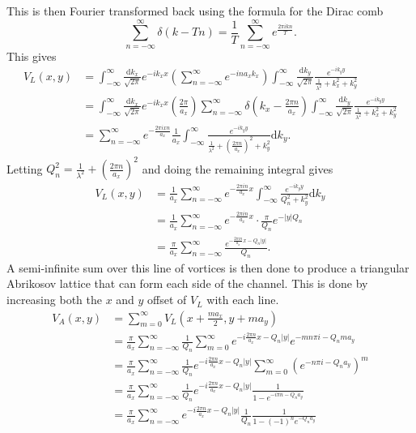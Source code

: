 \documentclass{article}
\numberwithin{equation}{section}
\begin{document}
This is then Fourier transformed back using the formula for the Dirac comb
\begin{equation}
    \sum_{n=-\infty}^\infty\delta(k-Tn) = \frac{1}{T}\sum_{n=-\infty}^\infty e^{\frac{2\pi ikn}{T}}.
\end{equation}
This gives
\begin{align*}
    V_L(x, y) &= \int_{-\infty}^\infty\frac{\mathrm{d}k_x}{\sqrt{2\pi}}e^{-ik_xx} \left(\sum_{n=-\infty}^\infty e^{-ina_xk_x}\right) \int_{-\infty}^\infty\frac{\mathrm{d}k_y}{\sqrt{2\pi}} \frac{e^{-ik_yy}}{\frac{1}{\lambda^2}+k_x^2+k_y^2} \\
    &= \int_{-\infty}^\infty\frac{\mathrm{d}k_x}{\sqrt{2\pi}}e^{-ik_xx} \left(\frac{2\pi}{a_x}\right)\sum_{n=-\infty}^\infty
    \delta\left(k_x - \frac{2\pi n}{a_x}\right) \int_{-\infty}^\infty\frac{\mathrm{d}k_y}{\sqrt{2\pi}} \frac{e^{-ik_yy}}{\frac{1}{\lambda^2}+k_x^2+k_y^2} \\
     &= \sum_{n=-\infty}^\infty e^{-\frac{2\pi ixn}{a_x}}\frac{1}{a_x} \int_{-\infty}^\infty\frac{e^{-ik_yy}} {\frac{1}{\lambda^2}+\left(\frac{2\pi n}{a_x}\right)^2+k_y^2}\mathrm{d}k_y.
\end{align*}
Letting $Q_n^2 = \frac{1}{\lambda^2} + \left(\frac{2\pi n}{a_x}\right)^2$ and doing the remaining integral gives
\begin{align}
    V_L(x, y) &= \frac{1}{a_x}\sum_{n=-\infty}^\infty e^{-\frac{2\pi in}{a_x}x} \int_{-\infty}^\infty\frac{e^{-ik_yy}} {Q_n^2+k_y^2}\mathrm{d}k_y \nonumber \\
    &= \frac{1}{a_x}\sum_{n=-\infty}^\infty e^{-\frac{2\pi in}{a_x}x}\cdot \frac{\pi}{Q_n}e^{-|y|Q_n} \nonumber \\
    &= \frac{\pi}{a_x}\sum_{n=-\infty}^\infty \frac{e^{-\frac{2\pi in}{a_x}x-Q_n|y|}}{Q_n}.
\end{align}
A semi-infinite sum over this line of vortices is then done to produce a triangular Abrikosov lattice that can form each side of the channel. This is done by increasing both the $x$ and $y$ offset of $V_L$ with each line.
\begin{align*}
    V_A(x, y) &= \sum_{m=0}^\infty V_L\left(x+\frac{ma_x}{2},y+ma_y\right) \\
    &= \frac{\pi}{a_x}\sum_{n=-\infty}^\infty\frac{1}{Q_n}\sum_{m=0}^\infty
    e^{-i\frac{2\pi n}{a_x}x-Q_n|y|}e^{-mn\pi i-Q_nma_y} \\
    &= \frac{\pi}{a_x}\sum_{n=-\infty}^\infty\frac{1}{Q_n}e^{-i\frac{2\pi n}{a_x}x-Q_n|y|} \sum_{m=0}^\infty\left(e^{-n\pi i-Q_na_y}\right)^m \\
    &= \frac{\pi}{a_x}\sum_{n=-\infty}^\infty\frac{1}{Q_n}e^{-i\frac{2\pi n}{a_x}x-Q_n|y|} \frac{1}{1-e^{-i\pi n-Q_na_y}} \\
    &= \frac{\pi}{a_x}\sum_{n=-\infty}^\infty e^{-i\frac{2\pi n}{a_x}x-Q_n|y|} \frac{1}{Q_n}\frac{1}{1-(-1)^ne^{-Q_na_y}}
\end{align*}
\end{document}
